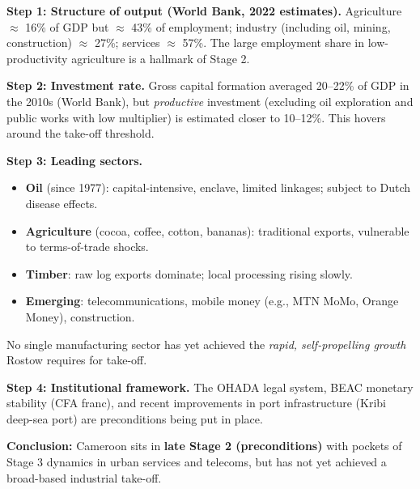 \documentclass[11pt]{article}
\begin{document}
\begin{experience}
\textbf{Step 1: Structure of output (World Bank, 2022 estimates).} Agriculture $\approx$ 16\% of GDP but $\approx$ 43\% of employment; industry (including oil, mining, construction) $\approx$ 27\%; services $\approx$ 57\%. The large employment share in low-productivity agriculture is a hallmark of Stage 2.

\textbf{Step 2: Investment rate.} Gross capital formation averaged 20–22\% of GDP in the 2010s (World Bank), but \emph{productive} investment (excluding oil exploration and public works with low multiplier) is estimated closer to 10–12\%. This hovers around the take-off threshold.

\textbf{Step 3: Leading sectors.} 
\begin{itemize}
  \item \textbf{Oil} (since 1977): capital-intensive, enclave, limited linkages; subject to Dutch disease effects.
  \item \textbf{Agriculture} (cocoa, coffee, cotton, bananas): traditional exports, vulnerable to terms-of-trade shocks.
  \item \textbf{Timber}: raw log exports dominate; local processing rising slowly.
  \item \textbf{Emerging}: telecommunications, mobile money (e.g., MTN MoMo, Orange Money), construction.
\end{itemize}
No single manufacturing sector has yet achieved the \emph{rapid, self-propelling growth} Rostow requires for take-off.

\textbf{Step 4: Institutional framework.} The OHADA legal system, BEAC monetary stability (CFA franc), and recent improvements in port infrastructure (Kribi deep-sea port) are preconditions being put in place.

\textbf{Conclusion:} Cameroon sits in \textbf{late Stage 2 (preconditions)} with pockets of Stage 3 dynamics in urban services and telecoms, but has not yet achieved a broad-based industrial take-off.
\end{experience}
\end{document}
